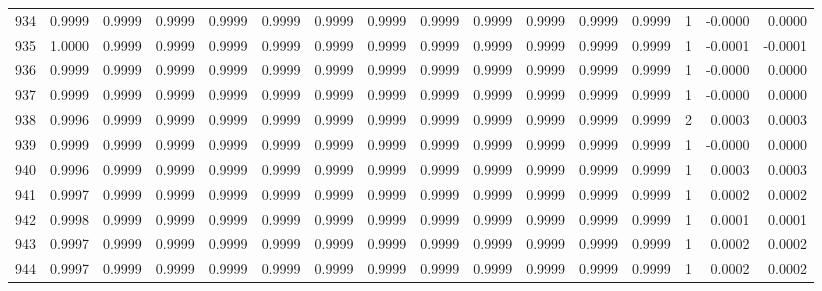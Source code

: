 \begin{tabular}{lrrrrrrrrrrrrrrr}
934 &      0.9999 &  0.9999 &  0.9999 &  0.9999 &  0.9999 &  0.9999 &  0.9999 &  0.9999 &  0.9999 &  0.9999 &   0.9999 &     0.9999 &      1 &                   -0.0000 &                     0.0000 \\
935 &      1.0000 &  0.9999 &  0.9999 &  0.9999 &  0.9999 &  0.9999 &  0.9999 &  0.9999 &  0.9999 &  0.9999 &   0.9999 &     0.9999 &      1 &                   -0.0001 &                    -0.0001 \\
936 &      0.9999 &  0.9999 &  0.9999 &  0.9999 &  0.9999 &  0.9999 &  0.9999 &  0.9999 &  0.9999 &  0.9999 &   0.9999 &     0.9999 &      1 &                   -0.0000 &                     0.0000 \\
937 &      0.9999 &  0.9999 &  0.9999 &  0.9999 &  0.9999 &  0.9999 &  0.9999 &  0.9999 &  0.9999 &  0.9999 &   0.9999 &     0.9999 &      1 &                   -0.0000 &                     0.0000 \\
938 &      0.9996 &  0.9999 &  0.9999 &  0.9999 &  0.9999 &  0.9999 &  0.9999 &  0.9999 &  0.9999 &  0.9999 &   0.9999 &     0.9999 &      2 &                    0.0003 &                     0.0003 \\
939 &      0.9999 &  0.9999 &  0.9999 &  0.9999 &  0.9999 &  0.9999 &  0.9999 &  0.9999 &  0.9999 &  0.9999 &   0.9999 &     0.9999 &      1 &                   -0.0000 &                     0.0000 \\
940 &      0.9996 &  0.9999 &  0.9999 &  0.9999 &  0.9999 &  0.9999 &  0.9999 &  0.9999 &  0.9999 &  0.9999 &   0.9999 &     0.9999 &      1 &                    0.0003 &                     0.0003 \\
941 &      0.9997 &  0.9999 &  0.9999 &  0.9999 &  0.9999 &  0.9999 &  0.9999 &  0.9999 &  0.9999 &  0.9999 &   0.9999 &     0.9999 &      1 &                    0.0002 &                     0.0002 \\
942 &      0.9998 &  0.9999 &  0.9999 &  0.9999 &  0.9999 &  0.9999 &  0.9999 &  0.9999 &  0.9999 &  0.9999 &   0.9999 &     0.9999 &      1 &                    0.0001 &                     0.0001 \\
943 &      0.9997 &  0.9999 &  0.9999 &  0.9999 &  0.9999 &  0.9999 &  0.9999 &  0.9999 &  0.9999 &  0.9999 &   0.9999 &     0.9999 &      1 &                    0.0002 &                     0.0002 \\
944 &      0.9997 &  0.9999 &  0.9999 &  0.9999 &  0.9999 &  0.9999 &  0.9999 &  0.9999 &  0.9999 &  0.9999 &   0.9999 &     0.9999 &      1 &                    0.0002 &                     0.0002 \\

\end{tabular}
